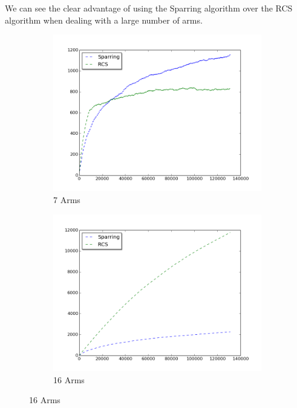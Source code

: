 \documentclass{llncs}
\begin{document}
We can see the clear advantage of using the Sparring algorithm over the RCS algorithm when dealing with a large number of arms.
\begin{figure}[h!]
\centering
\begin{subfigure}{.5\textwidth}
  \centering
  \includegraphics[scale=0.3, natwidth=410,natheight=442]{figures/rcs_sparring_MQ2007_7arms.png}
  \caption{7 Arms}
  \label{fig:sub1}
\end{subfigure}%
\begin{subfigure}{.5\textwidth}
  \centering
  \includegraphics[scale=0.3, natwidth=410,natheight=442]{figures/rcs_sparring_MQ2007_16arms.png}
  \caption{16 Arms}
  \label{fig:sub2}
\end{subfigure}

\end{figure}
\end{document}
